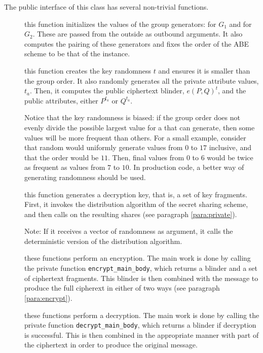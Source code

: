 \documentclass{article}
\begin{document}
The public interface of this class has several non-trivial functions.
\begin{description}
\item[] this function initializes the values of the group generators:  for $G_1$ and  for $G_2$. These are passed from the outside as outbound arguments. It also computes the pairing of these generators and fixes the order of the ABE scheme to be that of the \cPFC instance.
\item[] this function creates the key randomness $t$ and ensures it is smaller than the group order. It also randomly generates all the private attribute values, $t_a$. Then, it computes the public ciphertext blinder, $e(P,Q)^t$, and the public attributes, either $P^{t_a}$ or $Q^{t_a}$.

Notice that the key randomness is biased: if the group order does not evenly divide the possible largest value for a \cBig that  can generate, then some values will be more frequent than others. For a small example, consider that random would uniformly generate values from $0$ to $17$ inclusive, and that the order would be $11$. Then, final values from $0$ to $6$ would be twice as frequent as values from $7$ to $10$. In production code, a better way of generating randomness should be used.

\item[] this function generates a decryption key, that is, a set of key fragments. First, it invokes the distribution algorithm of the secret sharing scheme, and then calls  on the resulting shares (see paragraph \ref{para:private}). 

Note: If it receives a vector of randomness as argument, it calls the deterministic version of the distribution algorithm.

\item[] these functions perform an encryption. The main work is done by calling the private function \verb|encrypt_main_body|, which returns a blinder and a set of ciphertext fragments. This blinder is then combined with the message to produce the full cipherext in either of two ways (see paragraph \ref{para:encrypt}).
\item[] these functions perform a decryption. The main work is done by calling the private function \verb|decrypt_main_body|, which returns a blinder if decryption is successful. This is then combined in the appropriate manner with part of the ciphertext in order to produce the original message.
\end{description}
\end{document}
